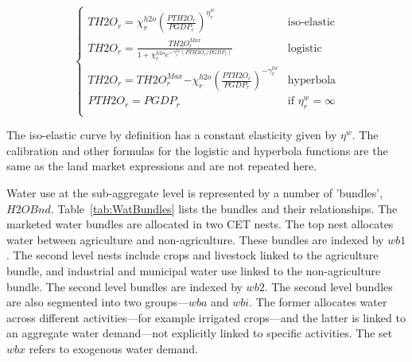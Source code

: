 \documentclass[11pt,letterpaper]{report}
\begin{document}
\begin{equation}
\label{eq:th2o}
\begin{cases}
   \displaystyle \mathit{TH2O}_{r} =
      \chi^{\mathit{h2o}}_{r}
      \left( \frac {\mathit{PTH2O}_{r}} {\mathit{PGDP}_r}
      \right)^{\eta^w_r}
   & \textrm{iso-elastic} \\
   \displaystyle \mathit{TH2O}_{r} =
      \frac {\mathit{TH2O}^{\mathit{Max}}_r}
         {1 + \chi^{\mathit{h2o}}_{r} e^{-\gamma^{\mathit{tw}}_{r}
            (\mathit{PTH2O}_{r}/\mathit{PGDP}_r)}}
   & \textrm{logistic} \\
   \displaystyle \mathit{TH2O}_{r} =
      {\mathit{TH2O}^{\mathit{Max}}_r}
         {- \chi^{\mathit{h2o}}_{r}
            \left( \frac{\mathit{PTH2O}_{r}} {\mathit{PGDP}_r}
            \right)^{-\gamma^{\mathit{tw}}_{r}}}
   & \textrm{hyperbola} \\
   \displaystyle \mathit{PTH2O}_{r} = \mathit{PGDP}_{r}
   & \textrm{if } \eta^w_{r} = \infty \\
\end{cases}
\end{equation}

The iso-elastic curve by definition has a constant elasticity given by $\eta^w$.
The calibration and other formulas for the logistic and hyperbola functions are
the same as the land market expressions and are not repeated here.

Water use at the sub-aggregate level is represented by a number of 'bundles',
$\mathit{H2OBnd}$. Table~\ref{tab:WatBundles} lists the bundles and their
relationships. The marketed water bundles are allocated in two CET nests. The
top nest allocates water between agriculture and non-agriculture. These bundles
are indexed by $\mathit{wb1}$. The second level nests include crops and
livestock linked to the agriculture bundle, and industrial and municipal water
use linked to the non-agriculture bundle. The second level bundles are indexed
by $\mathit{wb2}$. The second level bundles are also segmented into two
groups---$\mathit{wba}$ and $\mathit{wbi}$. The former allocates water across
different activities---for example irrigated crops---and the latter is linked to
an aggregate water demand---not explicitly linked to specific activities. The
set $\mathit{wbx}$ refers to exogenous water demand.
\end{document}
